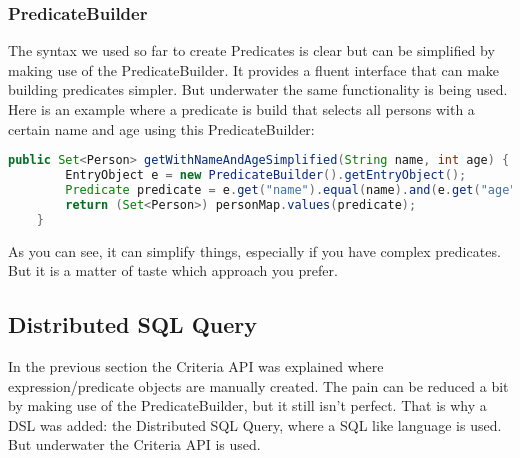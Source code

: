 \subsubsection*{PredicateBuilder}
The syntax we used so far to create Predicates is clear but can be simplified by making use of the PredicateBuilder. It provides a fluent interface that can make building predicates simpler. But underwater the same functionality is being used. Here is an example where a predicate is build that selects all persons with a certain name and age using this PredicateBuilder:
\begin{lstlisting}[language=java]
    public Set<Person> getWithNameAndAgeSimplified(String name, int age) {
        EntryObject e = new PredicateBuilder().getEntryObject();
        Predicate predicate = e.get("name").equal(name).and(e.get("age").equal(age));
        return (Set<Person>) personMap.values(predicate);
    }
\end{lstlisting}
As you can see, it can simplify things, especially if you have complex predicates. But it is a matter of taste which approach you prefer.

\subsection*{Distributed SQL Query}
In the previous section the Criteria API was explained where expression/predicate objects are manually created. The pain can be reduced a bit by making use of the PredicateBuilder, but it still isn't perfect. That is why a DSL was added: the Distributed SQL Query, where a SQL like language is used. But underwater the Criteria API is used. 

